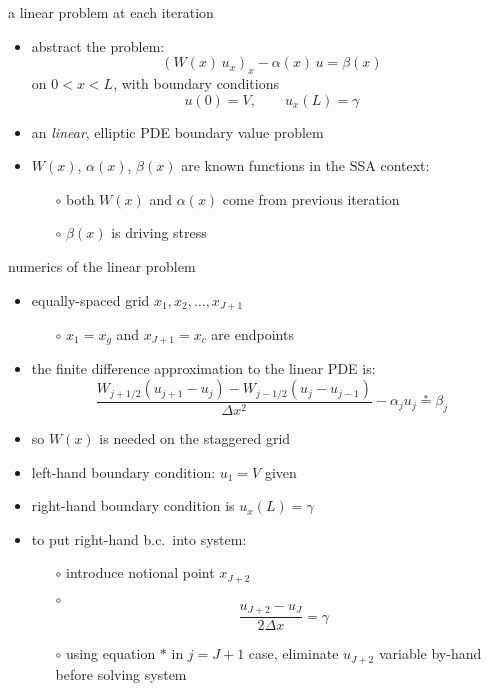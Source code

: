 \begin{frame}{a linear problem at each iteration}
\begin{itemize}
\item abstract the problem:
   $$\left(W(x)\, u_x\right)_x - \alpha(x)\, u = \beta(x)$$
on $0 < x < L$, with boundary conditions
   $$u(0) = V, \qquad  u_x(L) = \gamma$$
\item an \emph{linear}, elliptic PDE boundary value problem
\item $W(x)$, $\alpha(x)$, $\beta(x)$ are known functions in the SSA context:
  \begin{itemize}
  \item[$\circ$] both $W(x)$ and $\alpha(x)$ come from previous iteration
  \item[$\circ$] $\beta(x)$ is driving stress
  \end{itemize}
\end{itemize}
\end{frame}


\begin{frame}{numerics of the linear problem}

\begin{itemize}
\item equally-spaced grid $x_1,x_2,\dots,x_{J+1}$
  \begin{itemize}
  \item[$\circ$] $x_1 = x_g$ and $x_{J+1} = x_c$ are endpoints
  \end{itemize}
\item the finite difference approximation to the linear PDE is:
$$\frac{W_{j+1/2} (u_{j+1} - u_j) - W_{j-1/2} (u_{j} - u_{j-1})}{\Delta x^2} - \alpha_j u_j \stackrel{\ast}{=} \beta_j$$
\item so $W(x)$ is needed on the staggered grid
\item left-hand boundary condition: $u_1 = V$ given
\item right-hand boundary condition is $u_x(L)=\gamma$
\item to put right-hand b.c.~into system:
  \begin{itemize}
  \item[$\circ$] introduce notional point $x_{J+2}$
  \item[$\circ$]
    $$\frac{u_{J+2} - u_J}{2 \Delta x} = \gamma$$
  \item[$\circ$] using equation $\ast$ in $j=J+1$ case, eliminate $u_{J+2}$ variable by-hand before solving system
  \end{itemize}
\end{itemize}
\end{frame}


